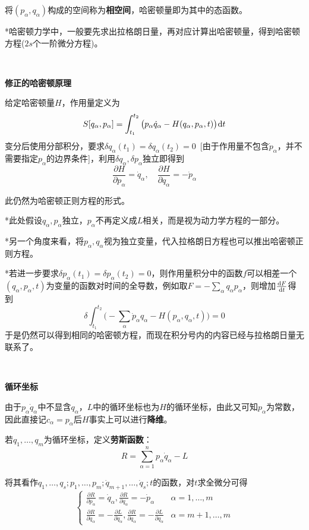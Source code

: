 \documentclass[a4paper,UTF8,fontset=windows]{ctexart}
\newcommand*{\dr}{\hspace{0.07em}\mathrm{d}}
\begin{document}
将$(p_\alpha,q_\alpha)$构成的空间称为\textbf{相空间}，哈密顿量即为其中的态函数。

*哈密顿力学中，一般要先求出拉格朗日量，再对应计算出哈密顿量，得到哈密顿方程($2s$个一阶微分方程)。

\

\textbf{修正的哈密顿原理}

给定哈密顿量$H$，作用量定义为
$$S[q_\alpha,p_\alpha]=\int_{t_1}^{t_2}\big(p_\alpha\dot{q}_\alpha-H(q_\alpha,p_\alpha,t)\big)\dr t$$
变分后使用分部积分，要求$\delta q_\alpha(t_1)=\delta q_\alpha(t_2)=0$\ [由于作用量不包含$\dot{p}_\alpha$，并不需要指定$p_\alpha$的边界条件]，利用$\delta q_\alpha,\delta p_\alpha$独立即得到
$$\frac{\partial H}{\partial p_\alpha}=\dot{q}_\alpha,\quad\frac{\partial H}{\partial q_\alpha}=-\dot{p}_\alpha$$

此仍然为哈密顿正则方程的形式。

*此处假设$q_\alpha,p_\alpha$独立，$p_\alpha$不再定义成$L$相关，而是视为动力学方程的一部分。

*另一个角度来看，将$p_\alpha,q_\alpha$视为独立变量，代入拉格朗日方程也可以推出哈密顿正则方程。

*若进一步要求$\delta p_\alpha(t_1)=\delta p_\alpha(t_2)=0$，则作用量积分中的函数$f$可以相差一个$(q_\alpha,p_\alpha,t)$为变量的函数对时间的全导数，例如取$F=-\sum_\alpha q_\alpha p_\alpha$，则增加$\frac{\dr F}{\dr t}$得到
$$\delta\int_{t_1}^{t_2}\big(-\sum_\alpha\dot{p}_\alpha q_\alpha-H(p_\alpha,q_\alpha,t)\big)=0$$
于是仍然可以得到相同的哈密顿方程，而现在积分号内的内容已经与拉格朗日量无联系了。

\

\textbf{循环坐标}

由于$p_\alpha\dot{q}_\alpha$中不显含$q_\alpha$，$L$中的循环坐标也为$H$的循环坐标，由此又可知$p_\alpha$为常数，因此直接记$c_\alpha=p_\alpha$后$H$事实上可以进行\textbf{降维}。

若$q_1,\dots,q_m$为循环坐标，定义\textbf{劳斯函数}：
$$R=\sum_{\alpha=1}^np_\alpha\dot{q}_\alpha-L$$

将其看作$q_1,\dots,q_s;p_1,\dots,p_m;\dot{q}_{m+1},\dots,\dot{q}_s;t$的函数，对$t$求全微分可得
$$\begin{cases}\frac{\partial R}{\partial p_\alpha}=\dot{q}_\alpha,\frac{\partial R}{\partial q_\alpha}=-\dot{p}_\alpha&\alpha=1,\dots,m\\\frac{\partial R}{\partial\dot{q}_\alpha}=-\frac{\partial L}{\partial\dot{q}_\alpha},\frac{\partial R}{\partial q_\alpha}=-\frac{\partial L}{\partial q_\alpha}&\alpha=m+1,\dots,m\end{cases}$$
\end{document}
